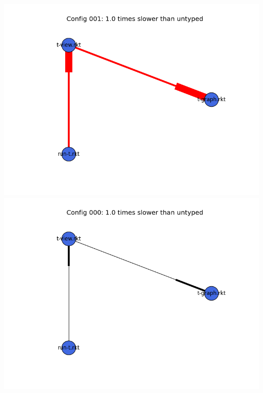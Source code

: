 \documentclass{article}
\begin{document}
\begin{itemize}
\includegraphics[width=\textwidth]{mbta-rs-module-graph-001.png}
\includegraphics[width=\textwidth]{mbta-rs-module-graph-000.png}
\end{itemize}
\end{document}
